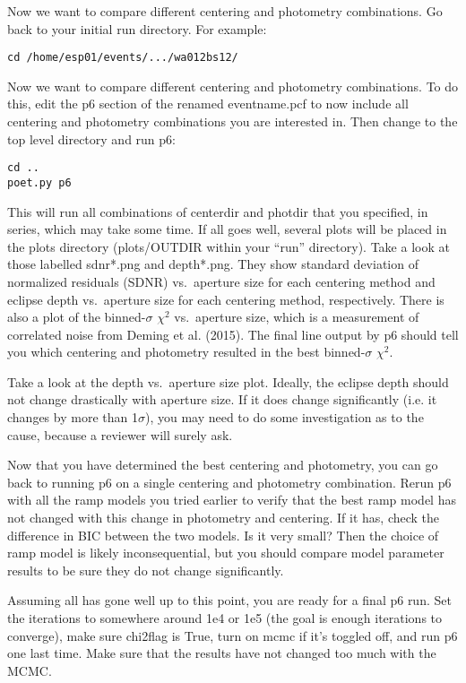 \documentclass[letterpaper,12pt]{article}
\begin{document}
Now we want to compare different centering and photometry
combinations. Go back to your initial run directory. For example:

\begin{verbatim}
cd /home/esp01/events/.../wa012bs12/
\end{verbatim}

Now we want to compare different centering and photometry
combinations. To do this, edit the p6 section of the renamed eventname.pcf
to now include all centering and photometry combinations you are
interested in. Then change to the top level directory and run p6:

\begin{verbatim}
cd ..
poet.py p6
\end{verbatim}

This will run all combinations of centerdir and photdir that you
specified, in series, which may take some time. If all goes well,
several plots will be placed in the plots directory (plots/OUTDIR
within your ``run'' directory).  Take a look at those labelled
sdnr*.png and depth*.png. They show standard deviation of normalized
residuals (SDNR) vs.\ aperture size for each centering method and
eclipse depth vs.\ aperture size for each centering method,
respectively. There is also a plot of the binned-$\sigma$ $\chi^2$
vs.\ aperture size, which is a measurement of correlated noise from
Deming et al. (2015). The final line output by p6 should tell you
which centering and photometry resulted in the best binned-$\sigma$
$\chi^2$.

Take a look at the depth vs.\ aperture size plot. Ideally, the eclipse
depth should not change drastically with aperture size. If it does
change significantly (i.e. it changes by more than 1$\sigma$), you may
need to do some investigation as to the cause, because a reviewer will
surely ask.

Now that you have determined the best centering and photometry, you
can go back to running p6 on a single centering and photometry
combination.  Rerun p6 with all the ramp models you tried earlier to
verify that the best ramp model has not changed with this change in
photometry and centering. If it has, check the difference in BIC
between the two models.  Is it very small? Then the choice of ramp
model is likely inconsequential, but you should compare model
parameter results to be sure they do not change significantly.

Assuming all has gone well up to this point, you are ready for a final
p6 run. Set the iterations to somewhere around 1e4 or 1e5 (the goal is
enough iterations to converge), make sure chi2flag is True, turn on
mcmc if it's toggled off, and run p6 one last time. Make sure that the
results have not changed too much with the MCMC.
\end{document}
